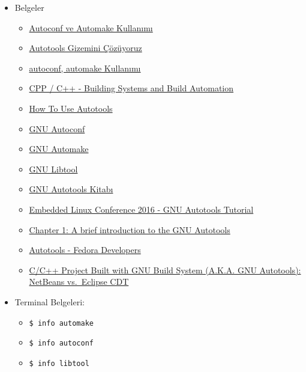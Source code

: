 \documentclass[
]{book}
\newenvironment{Shaded}{\begin{snugshade}}{\end{snugshade}}
\newcommand{\ExtensionTok}[1]{#1}
\newcommand{\NormalTok}[1]{#1}
\newcommand{\VariableTok}[1]{\textcolor[rgb]{0.00,0.00,0.00}{#1}}
\providecommand{\tightlist}{%
  \setlength{\itemsep}{0pt}\setlength{\parskip}{0pt}}
\begin{document}
\begin{Shaded}
\end{Shaded}

\begin{itemize}
\item
  Belgeler

  \begin{itemize}
  \tightlist
  \item
    \href{http://www.belgeler.org/howto/makefile-nasil-autoconf_automake.html}{Autoconf ve Automake Kullanımı}
  \item
    \href{https://ysar.net/yazilim-dunyasi/autotools.html}{Autotools Gizemini Çözüyoruz}
  \item
    \href{https://demirten.gitbooks.io/gomulu-linux/content/gnubuild/autoconf.html}{autoconf, automake Kullanımı}
  \item
    \href{https://caiorss.github.io/C-Cpp-Notes/building-systems.html}{CPP / C++ - Building Systems and Build Automation}
  \item
    \href{https://eklitzke.org/how-to-autotools}{How To Use Autotools}
  \item
    \href{https://www.gnu.org/software/autoconf/}{GNU Autoconf}
  \item
    \href{https://www.gnu.org/software/automake/automake.html}{GNU Automake}
  \item
    \href{https://www.gnu.org/software/libtool/libtool.html}{GNU Libtool}
  \item
    \href{https://www.gnu.org/software/autoconf/manual}{GNU Autotools Kitabı}
  \item
    \href{https://elinux.org/images/4/43/Petazzoni.pdf}{Embedded Linux Conference 2016 - GNU Autotools Tutorial}
  \item
    \href{http://freesoftwaremagazine.com/articles/brief_introduction_to_gnu_autotools/}{Chapter 1: A brief introduction to the GNU Autotools}
  \item
    \href{https://developer.fedoraproject.org/tech/languages/c/autotools.html}{Autotools - Fedora Developers}
  \item
    \href{http://thegreyblog.blogspot.com/2013/09/cc-project-built-with-gnu-build-system.html}{C/C++ Project Built with GNU Build System (A.K.A. GNU Autotools): NetBeans vs.~Eclipse CDT}
  \end{itemize}
\item
  Terminal Belgeleri:

  \begin{itemize}
  \tightlist
  \item
    \texttt{\$\ info\ automake}
  \item
    \texttt{\$\ info\ autoconf}
  \item
    \texttt{\$\ info\ libtool}
  \end{itemize}
\end{itemize}
\end{document}
